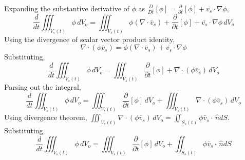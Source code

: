 \documentclass[class=report, 12pt, crop=false]{standalone}
\begin{document}
\begin{center}
Expanding the substantive derivative of $\phi$ as $\displaystyle \frac{D}{Dt}[\phi] = \frac{\partial}{\partial t}[\phi] + \bar{v_{s}}\cdot\nabla\phi$,
$$\frac{d}{dt}\iiint^{}_{V_{s}(t)}\phi \,dV_{o} = \iiint^{}_{V_{s}(t)} \phi(\nabla \cdot\bar{v}_{s}) + \frac{\partial}{\partial t}[\phi] + \bar{v_{s}}\cdot\nabla\phi \,dV_{o}$$
Using the divergence of scalar vector product identity,
$$\nabla \cdot(\phi\bar{v}_{s}) = \phi(\nabla \cdot\bar{v}_{s}) + \bar{v_{s}}\cdot\nabla\phi$$
Substituting,
$$\frac{d}{dt}\iiint^{}_{V_{s}(t)}\phi \,dV_{o} = \iiint^{}_{V_{s}(t)} \frac{\partial}{\partial t}[\phi] + \nabla \cdot(\phi\bar{v}_{s}) \,dV_{o}$$
Parsing out the integral,
$$\frac{d}{dt}\iiint^{}_{V_{s}(t)}\phi \,dV_{o} = \iiint^{}_{V_{s}(t)} \frac{\partial}{\partial t}[\phi] \,dV_{o}  +  \iiint^{}_{V_{s}(t)}\nabla \cdot(\phi\bar{v}_{s}) \,dV_{o}$$
Using divergence theorem, $\displaystyle \iiint^{}_{V_{s}(t)}\nabla \cdot(\phi\bar{v}_{s}) \,dV_{o} = \iint^{}_{S_{s}(t)}\phi\bar{v}_{s} \cdot\,\hat{n}dS$. Substituting,
$$\frac{d}{dt}\iiint^{}_{V_{s}(t)}\phi \,dV_{o} = \iiint^{}_{V_{s}(t)} \frac{\partial}{\partial t}[\phi] \,dV_{o}  +  \iint^{}_{S_{s}(t)}\phi\bar{v}_{s} \cdot\,\hat{n}dS$$

\end{center}
\end{document}
